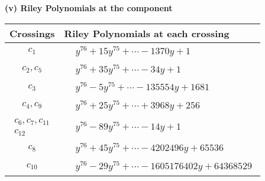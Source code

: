 \documentclass[1p]{elsarticle_modified}
\theoremstyle{definition}
\begin{document}
\newpage\renewcommand{\arraystretch}{1}
\flushleft \textbf{(v) Riley Polynomials at the component}\newline \\
\begin{tabular}{m{50pt}|m{274pt}}
Crossings & \hspace{64pt}Riley Polynomials at each crossing \\
\hline $$\begin{aligned}c_{1}\end{aligned}$$&$\begin{aligned}
&y^{76}+15 y^{75}+\cdots-1370 y+1
\end{aligned}$\\
\hline $$\begin{aligned}c_{2},c_{5}\end{aligned}$$&$\begin{aligned}
&y^{76}+35 y^{75}+\cdots-34 y+1
\end{aligned}$\\
\hline $$\begin{aligned}c_{3}\end{aligned}$$&$\begin{aligned}
&y^{76}-5 y^{75}+\cdots-135554 y+1681
\end{aligned}$\\
\hline $$\begin{aligned}c_{4},c_{9}\end{aligned}$$&$\begin{aligned}
&y^{76}+25 y^{75}+\cdots+3968 y+256
\end{aligned}$\\
\hline $$\begin{aligned}c_{6},c_{7},c_{11}\\c_{12}\end{aligned}$$&$\begin{aligned}
&y^{76}-89 y^{75}+\cdots-14 y+1
\end{aligned}$\\
\hline $$\begin{aligned}c_{8}\end{aligned}$$&$\begin{aligned}
&y^{76}+45 y^{75}+\cdots-4202496 y+65536
\end{aligned}$\\
\hline $$\begin{aligned}c_{10}\end{aligned}$$&$\begin{aligned}
&y^{76}-29 y^{75}+\cdots-1605176402 y+64368529
\end{aligned}$\\
\hline
\end{tabular}\\~\\
\end{document}
